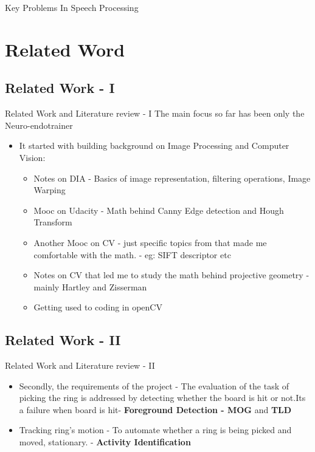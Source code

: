 \documentclass{beamer}
\begin{document}
\begin{frame}{Key Problems In Speech Processing}
\end{frame}

\section{Related Word}
\subsection{Related Work - I}
\begin{frame}{Related Work and Literature review - I}
\Large The main focus so far has been only the Neuro-endotrainer
\begin{itemize}
\item It started with building background on Image Processing and Computer Vision:
\begin{itemize}
\item \large Notes on DIA - Basics of image representation, filtering operations, Image Warping
\item \large Mooc on Udacity - Math behind Canny Edge detection and Hough Transform
\item \large Another Mooc on CV - just specific topics from that made me comfortable with the math. - eg: SIFT descriptor etc
\item \large Notes on CV that led me to study the math behind
projective geometry - mainly Hartley and Zisserman
\item \large Getting used to coding in openCV
\end{itemize}
\end{itemize}
\end{frame}

\subsection{Related Work - II}
\begin{frame}{Related Work and Literature review - II}
\begin{itemize}
\item \Large Secondly, the requirements of the project - The evaluation of the task of picking the ring is addressed by detecting whether the board is hit or not.Its a failure when board is hit- \textbf{Foreground Detection - MOG} and \textbf{TLD}
\item Tracking ring's motion - To automate whether a ring is being picked and moved, stationary. - \textbf{Activity Identification}
\end{itemize}
\end{frame}
\end{document}
